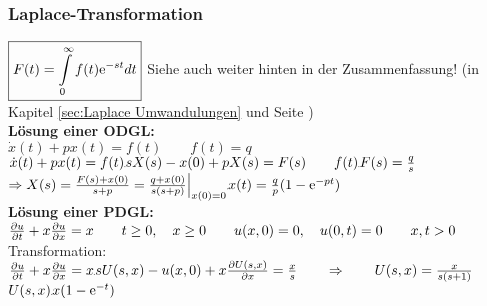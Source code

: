\subsubsection{Laplace-Transformation}

$\boxed{F(t)=\int\limits_{0}^{\infty}{f(t)\mathrm{e}^{-st}} dt}$ \qquad Siehe auch weiter hinten in der Zusammenfassung! (in Kapitel \ref{sec:Laplace Umwandulungen} und Seite \pageref{sec:Laplace Umwandulungen})\\

\textbf{Lösung einer ODGL:}\\

$\dot{x}(t)+p x(t)=f(t) \qquad f(t)=q$\\
$\dot{x}(t)+p x(t)=f(t)\FT s X(s)-x(0)+pX(s)=F(s) \qquad f(t)\FT F(s)=\frac{q}{s}$\\

$\Rightarrow X(s)=\frac{F(s)+x(0)}{s+p}=\frac{q+x(0)}{s(s+p)}\Big|_{x(0)=0}\IFT x(t)=\frac{q}{p}(1-\e^{-pt})$\\

\textbf{Lösung einer PDGL:}\\

$\frac{\partial u}{\partial t}+x\frac{\partial u}{\partial x}=x\qquad t\geq 0,\quad x\geq 0\qquad u(x,0)=0,\quad u(0,t)=0\qquad x,t>0$\\

Transformation: $\partFrac{u}{t}+x\partFrac{u}{x}=x\FT sU(s,x)-u(x,0)+x\partFrac{U(s,x)}{x}=\frac{x}{s}\qquad \Rightarrow \qquad U(s,x)=\frac{x}{s(s+1)}$\\
$U(s,x)\IFT x(1-\e^{-t})$











